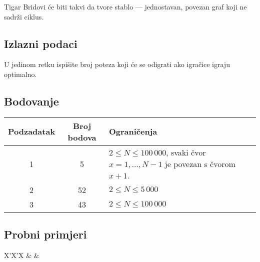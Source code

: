 \begin{statement}[
  problempoints=100,
  timelimit=1 sekunda,
  memorylimit=512 MiB,
]{Tigar}
Bridovi će biti takvi da tvore stablo --- jednostavan, povezan graf koji ne
sadrži ciklus.

\subsection*{Izlazni podaci}

U jedinom retku ispišite broj poteza koji će se odigrati ako igračice igraju
optimalno.

\subsection*{Bodovanje}

{\renewcommand{\arraystretch}{1.4}
  \setlength{\tabcolsep}{6pt}
  \begin{tabular}{ccl}
   Podzadatak & Broj bodova & Ograničenja \\ \midrule
    1 & 5 & $2 \le N \le 100\,000$, svaki čvor $x=1,\ldots,N-1$ je povezan s čvorom $x+1$.\\
    2 & 52 & $2 \le N \le 5\,000$ \\
    3 & 43 & $2 \le N \le 100\,000$
\end{tabular}}

\subsection*{Probni primjeri}
\begin{tabularx}{\textwidth}{X'X'X}
 &
 &
\end{tabularx}

\end{statement}

